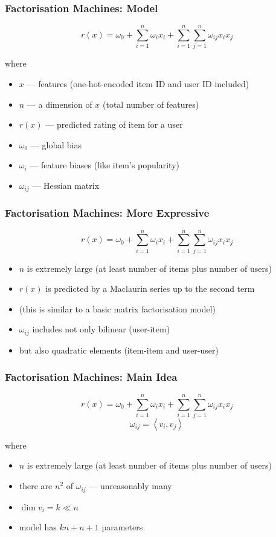 \documentclass[t]{beamer}
\begin{document}
\begin{frame}
  \frametitle{Factorisation Machines: Model}
  \begin{exampleblock}  {}$$r\left(x\right)=\omega_0+\sum\limits_{i=1}^n\omega_ix_i+\sum\limits_{i=1}^n\sum\limits_{j=1}^n\omega_{ij}x_ix_j$$
  \end{exampleblock}
  where
  \begin{itemize}
  \item $x$ --- features (one-hot-encoded item ID and user ID included)
  \item $n$ --- a dimension of $x$ (total number of features)
  \item $r\left(x\right)$ --- predicted rating of item for a user
  \item $\omega_0$ --- global bias
  \item $\omega_i$ --- feature biases (like item's popularity)
  \item $\omega_{ij}$ --- Hessian matrix
  \end{itemize}
\end{frame}
\begin{frame}
  \frametitle{Factorisation Machines: More Expressive}
  \begin{exampleblock}  {}$$r\left(x\right)=\omega_0+\sum\limits_{i=1}^n\omega_ix_i+\sum\limits_{i=1}^n\sum\limits_{j=1}^n\omega_{ij}x_ix_j$$
  \end{exampleblock}
  \begin{itemize}
  \item $n$ is extremely large (at least number of items plus number of users)
  \item $r\left(x\right)$ is predicted by a Maclaurin series up to the second term
  \item (this is similar to a basic matrix factorisation model)
  \item $\omega_{ij}$ includes not only bilinear (user-item)
  \item but also quadratic elements (item-item and user-user)
  \end{itemize}
\end{frame}
\begin{frame}
  \frametitle{Factorisation Machines: Main Idea}
  \begin{exampleblock}  {}$$r\left(x\right)=\omega_0+\sum\limits_{i=1}^n\omega_ix_i+\sum\limits_{i=1}^n\sum\limits_{j=1}^n\omega_{ij}x_ix_j$$
    $$\omega_{ij}=\left<v_i,v_j\right>$$
  \end{exampleblock}
  where
  \begin{itemize}
  \item $n$ is extremely large (at least number of items plus number of users)
  \item there are $n^2$ of $\omega_{ij}$ --- unreasonably many
  \item $\dim v_i=k\ll n$
  \item model has $kn + n + 1$ parameters
  \end{itemize}
\end{frame}
\end{document}
